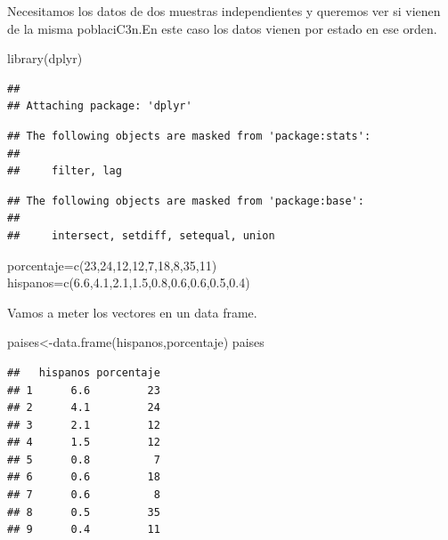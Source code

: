 \documentclass[
]{article}
\newenvironment{Shaded}{\begin{snugshade}}{\end{snugshade}}
\newcommand{\DecValTok}[1]{\textcolor[rgb]{0.00,0.00,0.81}{#1}}
\newcommand{\FloatTok}[1]{\textcolor[rgb]{0.00,0.00,0.81}{#1}}
\newcommand{\FunctionTok}[1]{\textcolor[rgb]{0.00,0.00,0.00}{#1}}
\newcommand{\NormalTok}[1]{#1}
\newcommand{\OtherTok}[1]{\textcolor[rgb]{0.56,0.35,0.01}{#1}}
\begin{document}
Necesitamos los datos de dos muestras independientes y queremos ver si
vienen de la misma poblaciC3n.En este caso los datos vienen por estado
en ese orden.

\begin{Shaded}
\begin{Highlighting}[]
\FunctionTok{library}\NormalTok{(dplyr)}
\end{Highlighting}
\end{Shaded}

\begin{verbatim}
## 
## Attaching package: 'dplyr'
\end{verbatim}

\begin{verbatim}
## The following objects are masked from 'package:stats':
## 
##     filter, lag
\end{verbatim}

\begin{verbatim}
## The following objects are masked from 'package:base':
## 
##     intersect, setdiff, setequal, union
\end{verbatim}

\begin{Shaded}
\begin{Highlighting}[]
\NormalTok{porcentaje}\OtherTok{=}\FunctionTok{c}\NormalTok{(}\DecValTok{23}\NormalTok{,}\DecValTok{24}\NormalTok{,}\DecValTok{12}\NormalTok{,}\DecValTok{12}\NormalTok{,}\DecValTok{7}\NormalTok{,}\DecValTok{18}\NormalTok{,}\DecValTok{8}\NormalTok{,}\DecValTok{35}\NormalTok{,}\DecValTok{11}\NormalTok{)}
\NormalTok{hispanos}\OtherTok{=}\FunctionTok{c}\NormalTok{(}\FloatTok{6.6}\NormalTok{,}\FloatTok{4.1}\NormalTok{,}\FloatTok{2.1}\NormalTok{,}\FloatTok{1.5}\NormalTok{,}\FloatTok{0.8}\NormalTok{,}\FloatTok{0.6}\NormalTok{,}\FloatTok{0.6}\NormalTok{,}\FloatTok{0.5}\NormalTok{,}\FloatTok{0.4}\NormalTok{)}
\end{Highlighting}
\end{Shaded}

Vamos a meter los vectores en un data frame.

\begin{Shaded}
\begin{Highlighting}[]
\NormalTok{paises}\OtherTok{\textless{}{-}}\FunctionTok{data.frame}\NormalTok{(hispanos,porcentaje)}
\NormalTok{paises}
\end{Highlighting}
\end{Shaded}

\begin{verbatim}
##   hispanos porcentaje
## 1      6.6         23
## 2      4.1         24
## 3      2.1         12
## 4      1.5         12
## 5      0.8          7
## 6      0.6         18
## 7      0.6          8
## 8      0.5         35
## 9      0.4         11
\end{verbatim}
\end{document}
